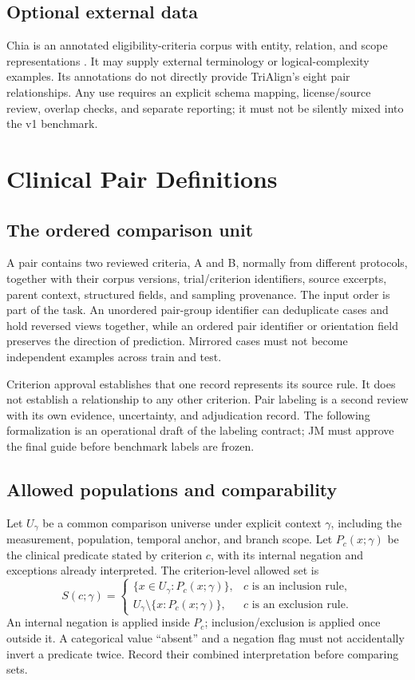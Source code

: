 \documentclass[10pt,letterpaper]{article}
\begin{document}
\subsection{Optional external data}
Chia is an annotated eligibility-criteria corpus with entity, relation, and
scope representations \cite{chia}. It may supply external terminology or
logical-complexity examples. Its annotations do not directly provide
TriAlign's eight pair relationships. Any use requires an explicit schema
mapping, license/source review, overlap checks, and separate reporting; it
must not be silently mixed into the v1 benchmark.

\section{Clinical Pair Definitions}
\label{sec:pairs}

\subsection{The ordered comparison unit}
A pair contains two reviewed criteria, A and B, normally from different
protocols, together with their corpus versions, trial/criterion identifiers,
source excerpts, parent context, structured fields, and sampling provenance.
The input order is part of the task. An unordered pair-group identifier can
deduplicate cases and hold reversed views together, while an ordered pair
identifier or orientation field preserves the direction of prediction.
Mirrored cases must not become independent examples across train and test.

Criterion approval establishes that one record represents its source rule.
It does not establish a relationship to any other criterion. Pair labeling is
a second review with its own evidence, uncertainty, and adjudication record.
The following formalization is an operational draft of the labeling contract;
JM must approve the final guide before benchmark labels are frozen.

\subsection{Allowed populations and comparability}
Let $U_{\gamma}$ be a common comparison universe under explicit context
$\gamma$, including the measurement, population, temporal anchor, and branch
scope. Let $P_c(x;\gamma)$ be the clinical predicate stated by criterion $c$,
with its internal negation and exceptions already interpreted. The
criterion-level allowed set is
\[
 S(c;\gamma)=
 \begin{cases}
 \{x\in U_{\gamma}:P_c(x;\gamma)\}, & c\text{ is an inclusion rule},\\
 U_{\gamma}\setminus\{x:P_c(x;\gamma)\}, & c\text{ is an exclusion rule}.
 \end{cases}
\]
An internal negation is applied inside $P_c$; inclusion/exclusion is applied
once outside it. A categorical value ``absent'' and a negation flag must not
accidentally invert a predicate twice. Record their combined interpretation
before comparing sets.
\end{document}
